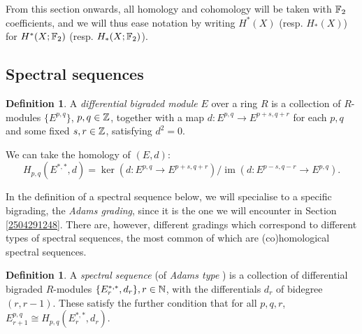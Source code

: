 \documentclass[11pt, titlepage]{article} %
\def\bb{\ensuremath\mathbb}
\def\inte{\ensuremath\mathbb{Z}}
\def\nat{\ensuremath\mathbb{N}}
\DeclareMathOperator{\im}{im}
\def\textcolour{\textcolor}
\numberwithin{equation}{subsection}
\theoremstyle{plain}
\theoremstyle{definition}
\newtheorem{definition}[theorem]{Definition}
\begin{document}
From this section onwards, all homology and cohomology will be taken with \(\bb{F}_2\) coefficients, and we will thus ease notation by writing \(H^*(X)\) (resp. \(H_*(X)\)) for \(H^*(X; \bb{F}_2)\) (resp. \(H_*(X;\bb{F}_2)\)).

\subsection{Spectral sequences}\label{2504041910}


\begin{definition}
A \textit{differential bigraded module} \(E\) over a ring \(R\) is a collection of \(R\)-modules \(\{E^{p, q}\}\), \(p, q\in \inte\), together with a map \(d : E^{p, q} \to E^{p+s, q+r}\) for each \(p, q\) and some fixed \(s,r \in \inte\), satisfying \(d^2=0\). 
\end{definition}

We can take the homology of \((E, d)\):
\[H_{p, q}(E^{*, *}, d)=\ker(d : E^{p, q}\to E^{p+s, q+r})/\im(d : E^{p-s, q-r}\to E^{p, q}).\]

In the definition of a spectral sequence below, we will specialise to a specific bigrading, the \textit{Adams grading}, since it is the one we will encounter in Section \ref{2504291248}. There are, however, different gradings which correspond to different types of spectral sequences, the most common of which are (co)homological spectral sequences. 

\begin{definition}
A \textit{spectral sequence} (of \textit{Adams type}%
) is a collection of differential bigraded \(R\)-modules \(\{E^{*, *}_r, d_r\}, r \in \nat\), with the differentials \(d_r\) of bidegree \((r, r-1)\). These satisfy the further condition that for all \(p, q, r\), \(E^{p, q}_{r+1}\cong H_{p, q}(E_r^{*, *}, d_r)\).
\end{definition}

\end{document}
